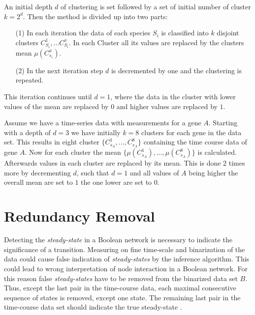 An initial depth $d$ of clustering is set followed by a set of initial number of cluster $k=2^d$. Then the method is divided up into two parts:

\begin{itemize}
\item[(1)] In each iteration the data of each species $S_{i}$  is classified into $k$ disjoint clusters $ C_{S{_i}}^{1},...C_{S{_i}}^{x}$. In each Cluster all its values are replaced by the clusters mean $\mu(C_{s_{i}}^{x})$.
\item[(2)]  In the next iteration step $d$ is decremented by one and the clustering is repeated.
\end{itemize}

This iteration continues until $d=1$, where the data in the cluster with lower values of the mean are replaced by $0$ and higher values are replaced by $1$.



\begin{exmp}Assume we have a time-series data with measurements for a gene $A$. Starting with a depth of $d=3$ we have initially $k=8$ clusters for each gene in the data set. This results in eight cluster $\{C_{s{_A}}^{1},...,C_{s{_A}}^{8}\}$ containing the time course data of gene $A$. Now for each cluster the mean $\{\mu(C_{s_{A}}^{1}),...,\mu(C_{s_{A}}^{8})\}$ is calculated. Afterwards values in each cluster are replaced by its mean. This is done 2 times more by decrementing $d$, such that $d=1$ and all values of $A$ being higher the overall mean are set to $1$ the one lower are set to $0$. \end{exmp}


\section{Redundancy Removal}
Detecting the \textit{steady-state} in a Boolean network is necessary to indicate the significance of a transition. Measuring on fine time-scale and binarization of the data could cause false indication of \textit{steady-states} by the inference algorithm. This could lead to wrong interpretation of node interaction in a Boolean network. For this reason false \textit{steady-states} have to be removed from the binarized data set $B$. Thus, except the last pair in the time-course data, each maximal consecutive sequence of states is removed, except one state. The remaining last pair in the time-course data set should indicate the true steady-state \citep{Berestovsky.2013}.


